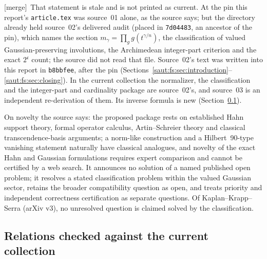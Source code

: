 \documentclass[11pt]{article}
\theoremstyle{definition}
\theoremstyle{remark}
\newcommand{\cc}{\mathfrak c}
\newcommand{\mergetag}{\textup{[merge]}}
\numberwithin{equation}{section}
\begin{document}
\mergetag\ That statement is stale and is not printed as current. At the pin this
report's \texttt{article.tex} was source~01 alone, as the source says; but the
directory already held source~02's delivered audit (placed in \texttt{7d04483}, an
ancestor of the pin), which names the section $m_\gamma=\prod_gg(t^{\gamma/n})$, the
classification of valued Gaussian-preserving involutions, the Archimedean integer-part
criterion and the exact $2^{\cc}$ count; the source did not read that file. Source~02's
text was written into this report in \texttt{b8bbfee}, after the pin
(Sections~\ref{saut:fs:sec:introduction}--\ref{saut:fs:sec:closing}). In the current
collection the normalizer, the classification and the integer-part and cardinality
package are source~02's, and source~03 is an independent re-derivation of them. Its
inverse formula is new (Section~\ref{saut:gr:sec:relations}).

On novelty the source says: the proposed package rests on established Hahn support
theory, formal operator calculus, Artin--Schreier theory and classical
transcendence-basis arguments; a norm-like construction and a Hilbert~90-type vanishing
statement naturally have classical analogues, and novelty of the exact Hahn and Gaussian
formulations requires expert comparison and cannot be certified by a web search. It
announces no solution of a named published open problem; it resolves a stated
classification problem within the valued Gaussian sector, retains the broader
compatibility question as open, and treats priority and independent correctness
certification as separate questions. Of Kaplan--Krapp--Serra \cite{KKS} (arXiv v3), no
unresolved question is claimed solved by the classification.

\subsection{Relations checked against the current collection}\label{saut:gr:sec:relations}
\end{document}
